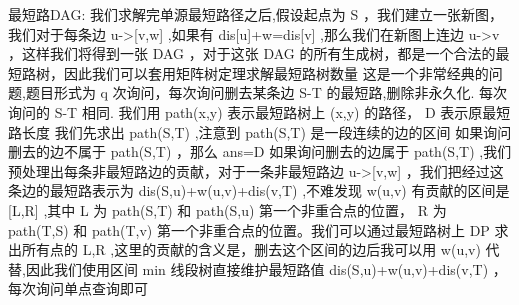 {}最短路DAG:\markdownRendererParagraphSeparator
{}我们求解完单源最短路径之后,假设起点为\markdownRendererDollarSign{} S \markdownRendererDollarSign{}，我们建立一张新图，我们对于每条边\markdownRendererDollarSign{} u->[v,w] \markdownRendererDollarSign{},如果有\markdownRendererDollarSign{} dis[u]+w=dis[v] \markdownRendererDollarSign{},那么我们在新图上连边\markdownRendererDollarSign{} u->v \markdownRendererDollarSign{}，这样我们将得到一张\markdownRendererDollarSign{} DAG \markdownRendererDollarSign{}，对于这张\markdownRendererDollarSign{} DAG \markdownRendererDollarSign{}的所有生成树，都是一个合法的最短路树，因此我们可以套用矩阵树定理求解最短路树数量\markdownRendererInterblockSeparator
{}
\markdownRendererSectionEnd \markdownRendererSectionBegin
{}\markdownRendererInterblockSeparator
{}这是一个非常经典的问题,题目形式为\markdownRendererDollarSign{} q \markdownRendererDollarSign{}次询问，每次询问删去某条边\markdownRendererDollarSign{} S-T \markdownRendererDollarSign{}的最短路,删除非永久化.\markdownRendererParagraphSeparator
{}每次询问的\markdownRendererDollarSign{} S-T \markdownRendererDollarSign{}相同.\markdownRendererParagraphSeparator
{}我们用\markdownRendererDollarSign{} path(x,y) \markdownRendererDollarSign{}表示最短路树上\markdownRendererDollarSign{} (x,y) \markdownRendererDollarSign{}的路径，\markdownRendererDollarSign{} D \markdownRendererDollarSign{}表示原最短路长度\markdownRendererParagraphSeparator
{}我们先求出\markdownRendererDollarSign{} path(S,T) \markdownRendererDollarSign{},注意到\markdownRendererDollarSign{} path(S,T) \markdownRendererDollarSign{}是一段连续的边的区间\markdownRendererParagraphSeparator
{}如果询问删去的边不属于\markdownRendererDollarSign{} path(S,T) \markdownRendererDollarSign{}，那么\markdownRendererDollarSign{} ans=D \markdownRendererDollarSign{}\markdownRendererParagraphSeparator
{}如果询问删去的边属于\markdownRendererDollarSign{} path(S,T) \markdownRendererDollarSign{},我们预处理出每条非最短路边的贡献，对于一条非最短路边\markdownRendererDollarSign{} u->[v,w] \markdownRendererDollarSign{}，我们把经过这条边的最短路表示为\markdownRendererDollarSign{} dis(S,u)+w(u,v)+dis(v,T) \markdownRendererDollarSign{},不难发现\markdownRendererDollarSign{} w(u,v) \markdownRendererDollarSign{}有贡献的区间是\markdownRendererDollarSign{} [L,R] \markdownRendererDollarSign{},其中\markdownRendererDollarSign{} L \markdownRendererDollarSign{}为\markdownRendererDollarSign{} path(S,T) \markdownRendererDollarSign{}和\markdownRendererDollarSign{} path(S,u) \markdownRendererDollarSign{}第一个非重合点的位置，\markdownRendererDollarSign{} R \markdownRendererDollarSign{}为\markdownRendererDollarSign{} path(T,S) \markdownRendererDollarSign{}和\markdownRendererDollarSign{} path(T,v) \markdownRendererDollarSign{}第一个非重合点的位置。我们可以通过最短路树上\markdownRendererDollarSign{} DP \markdownRendererDollarSign{}求出所有点的\markdownRendererDollarSign{} L,R \markdownRendererDollarSign{},这里的贡献的含义是，删去这个区间的边后我可以用\markdownRendererDollarSign{} w(u,v) \markdownRendererDollarSign{}代替,因此我们使用区间\markdownRendererDollarSign{} min \markdownRendererDollarSign{}线段树直接维护最短路值\markdownRendererDollarSign{} dis(S,u)+w(u,v)+dis(v,T) \markdownRendererDollarSign{}，每次询问单点查询即可\markdownRendererInterblockSeparator
